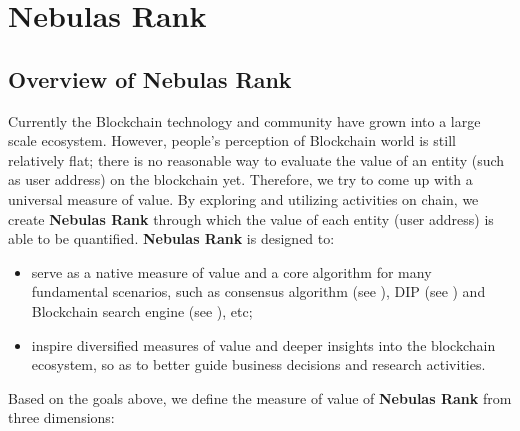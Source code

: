\section{Nebulas Rank}
\label{sec:rank}

\subsection{Overview of Nebulas Rank} \label{subsec:value}
Currently the Blockchain technology and community have grown into a large scale ecosystem. However, people's perception of Blockchain world is still relatively flat; there is no reasonable way to evaluate the value of an entity (such as user address) on the blockchain yet. Therefore, we try to come up with a universal measure of value. By exploring and utilizing activities on chain, we create \textbf{Nebulas Rank} through which the value of each entity (user address) is able to be quantified. \textbf{Nebulas Rank} is designed to:\begin{itemize}
	\item serve as a native measure of value and a core algorithm for many fundamental scenarios, such as consensus algorithm (see ), DIP (see ) and Blockchain search engine (see ), etc;
	\item inspire diversified measures of value and deeper insights into the blockchain ecosystem, so as to better guide business decisions and research activities.
\end{itemize}
Based on the goals above, we define the measure of value of \textbf{Nebulas Rank} from three dimensions:
